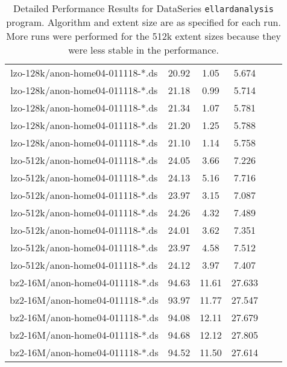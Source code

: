 \begin{table}
\begin{tabular}{|c|c|c|c|c|c|}
lzo-128k/anon-home04-011118-*.ds & 20.92 & 1.05 & 5.674 \\
lzo-128k/anon-home04-011118-*.ds & 21.18 & 0.99 & 5.714 \\
lzo-128k/anon-home04-011118-*.ds & 21.34 & 1.07 & 5.781 \\
lzo-128k/anon-home04-011118-*.ds & 21.20 & 1.25 & 5.788 \\
lzo-128k/anon-home04-011118-*.ds & 21.10 & 1.14 & 5.758 \\

lzo-512k/anon-home04-011118-*.ds & 24.05 & 3.66 & 7.226 \\
lzo-512k/anon-home04-011118-*.ds & 24.13 & 5.16 & 7.716 \\
lzo-512k/anon-home04-011118-*.ds & 23.97 & 3.15 & 7.087 \\
lzo-512k/anon-home04-011118-*.ds & 24.26 & 4.32 & 7.489 \\
lzo-512k/anon-home04-011118-*.ds & 24.01 & 3.62 & 7.351 \\
lzo-512k/anon-home04-011118-*.ds & 23.97 & 4.58 & 7.512 \\
lzo-512k/anon-home04-011118-*.ds & 24.12 & 3.97 & 7.407 \\

bz2-16M/anon-home04-011118-*.ds & 94.63 & 11.61 & 27.633 \\
bz2-16M/anon-home04-011118-*.ds & 93.97 & 11.77 & 27.547 \\
bz2-16M/anon-home04-011118-*.ds & 94.08 & 12.11 & 27.679 \\
bz2-16M/anon-home04-011118-*.ds & 94.68 & 12.12 & 27.805 \\
bz2-16M/anon-home04-011118-*.ds & 94.52 & 11.50 & 27.614 \\ 
\hline
\end{tabular}
\label{tab:dataseries}

\caption{Detailed Performance Results for DataSeries
\texttt{ellardanalysis} program.  Algorithm and extent size are as
specified for each run.  More runs were performed for the 512k extent
sizes because they were less stable in the performance.}

\end{table}

